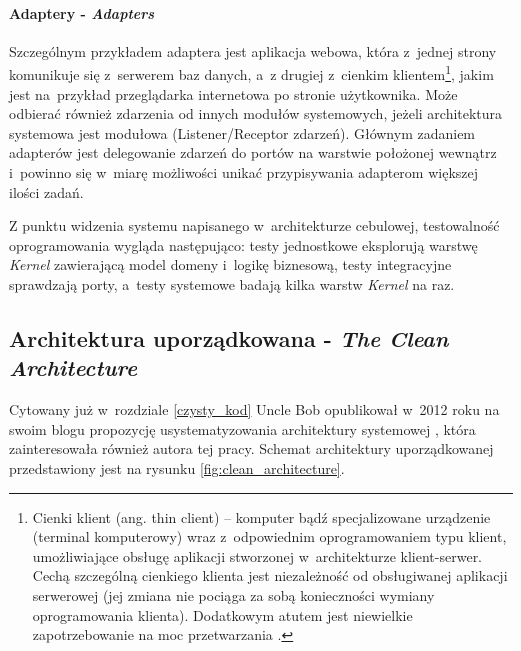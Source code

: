 \paragraph{Adaptery - \textit{Adapters}}
Szczególnym przykładem adaptera jest aplikacja webowa, która z~jednej strony komunikuje się z~serwerem baz danych, a~z drugiej z~cienkim klientem\footnote{Cienki klient (ang. thin client) – komputer bądź specjalizowane urządzenie (terminal komputerowy) wraz z~odpowiednim oprogramowaniem typu klient, umożliwiające obsługę aplikacji stworzonej w~architekturze klient-serwer. Cechą szczególną cienkiego klienta jest niezależność od obsługiwanej aplikacji serwerowej (jej zmiana nie pociąga za sobą konieczności wymiany oprogramowania klienta). Dodatkowym atutem jest niewielkie zapotrzebowanie na moc przetwarzania \cite{website:wikipedia}.}, jakim jest na~przykład przeglądarka internetowa po stronie użytkownika. Może odbierać również zdarzenia od innych modułów systemowych, jeżeli architektura systemowa jest modułowa (Listener/Receptor zdarzeń). Głównym zadaniem adapterów jest delegowanie zdarzeń do portów na warstwie położonej wewnątrz i~powinno się w~miarę możliwości unikać przypisywania adapterom większej ilości zadań.

Z punktu widzenia systemu napisanego w~architekturze cebulowej, testowalność oprogramowania wygląda następująco: testy jednostkowe eksplorują warstwę \textit{Kernel} zawierającą model domeny i~logikę biznesową, testy integracyjne sprawdzają porty, a~testy systemowe badają kilka warstw \textit{Kernel} na raz.

\subsection{Architektura uporządkowana - \textit{The Clean Architecture}}
\label{clean_architecture_opis}
Cytowany już w~rozdziale \ref{czysty_kod} Uncle Bob opublikował w~2012 roku na swoim blogu propozycję usystematyzowania architektury systemowej  \cite{website:cecil:blog}, która zainteresowała również autora tej pracy. Schemat architektury uporządkowanej przedstawiony jest na rysunku \ref{fig:clean_architecture}.
\newpage


